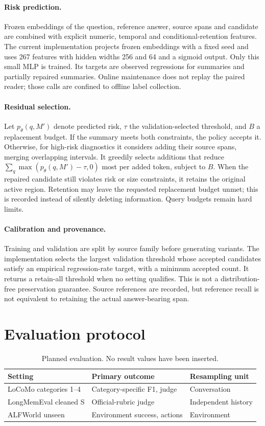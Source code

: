 \documentclass[11pt]{article}
\begin{document}
\paragraph{Risk prediction.}
Frozen embeddings of the question, reference answer, source spans and candidate
are combined with explicit numeric, temporal and conditional-retention features.
The current implementation projects frozen embeddings with a fixed seed and
uses 267 features with hidden widths 256 and 64 and a sigmoid output. Only this
small MLP is trained. Its targets are observed regressions for summaries and
partially repaired summaries. Online maintenance does not replay the paired
reader; those calls are confined to offline label collection.

\paragraph{Residual selection.}
Let $p_\theta(q,M')$ denote predicted risk, $\tau$ the validation-selected
threshold, and $B$ a replacement budget. If the summary meets both constraints,
the policy accepts it. Otherwise, for high-risk diagnostics it considers adding
their source spans, merging overlapping intervals. It greedily selects additions
that reduce $\sum_q\max(p_\theta(q,M')-\tau,0)$ most per added token, subject to
$B$. When the repaired candidate still violates risk or size constraints, it
retains the original active region. Retention may leave the requested replacement
budget unmet; this is recorded instead of silently deleting information. Query
budgets remain hard limits.

\paragraph{Calibration and provenance.}
Training and validation are split by source family before generating variants.
The implementation selects the largest validation threshold whose accepted
candidates satisfy an empirical regression-rate target, with a minimum accepted
count. It returns a retain-all threshold when no setting qualifies. This is not a
distribution-free preservation guarantee. Source references are recorded, but
reference recall is not equivalent to retaining the actual answer-bearing span.

\section{Evaluation protocol}
\begin{table}[h]
\centering
\begin{tabular}{lll}
\toprule
Setting & Primary outcome & Resampling unit \\
\midrule
LoCoMo categories 1--4 & Category-specific F1, judge & Conversation \\
LongMemEval cleaned S & Official-rubric judge & Independent history \\
ALFWorld unseen & Environment success, actions & Environment \\
\bottomrule
\end{tabular}
\caption{Planned evaluation. No result values have been inserted.}
\end{table}
\end{document}
